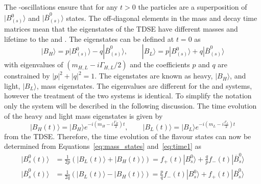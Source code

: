 {The \bsd-\barbsd oscillations ensure that for any $t>0$ the particles are a superposition of $| B^0_{(s)} \rangle$ and $| \overline{B}^0_{(s)} \rangle$ states. The off-diagonal elements in the mass and decay time matrices mean that the eigenstates of the TDSE have different masses and lifetime to the \bsd and \barbsd. The eigenstates can be defined at $t=0$ as
\begin{equation}
| B_H \rangle = p | B^0_{(s)} \rangle - q |\overline{B}^0_{(s)} \rangle, \qquad |B_L \rangle = p  | B^0_{(s)} \rangle + q | \overline{B}^0_{(s)} \rangle
\label{eq:mass_states}
\end{equation}
with eigenvalues of $(m_{H,L} - i\Gamma_{H,L}/2)$ and the coefficients $p$ and $q$ are constrained by $|p|^2 + |q|^2 = 1$. The eigenstates are known as heavy, $| B_H \rangle$, and light, $| B_L \rangle$, mass eigenstates. The eigenvalues are different for the \bd and \bs systems, however the treatment of the two systems is identical. To simplify the notation only the \bs system will be described in the following discussion.
The time evolution of the heavy and light mass eigenstates is given by
\begin{equation}
  | B_H (t)\rangle = | B_H \rangle e^{-i(m_H - i\frac{\Gamma_H}{2})t}, \qquad | B_L (t)\rangle = | B_L \rangle e^{-i(m_L - i\frac{\Gamma_L}{2})t}
\label{eq:time1}
\end{equation}
from the TDSE. Therefore, the time evolution of the flavour states can now be determined from Equations~\ref{eq:mass_states} and~\ref{eq:time1} as
\begin{align}
| B^{0}_{s}(t) \rangle &= \frac{1}{2p}\left(|B_{L}(t)\rangle + |B_{H}(t) \rangle \right)  = f_{+}(t) |B^{0}_{s} \rangle + \frac{q}{p}f_{-}(t) |\overline{B}^{0}_{s}\rangle  \label{eq:AAA}\\
| \overline{B}^{0}_{s}(t) \rangle &= \frac{1}{2q}\left(|B_{L}(t)\rangle - |B_{H}(t) \rangle \right)  = \frac{p}{q}f_{-}(t) |B^{0}_{s} \rangle+ f_{+}(t) |\overline{B}^{0}_{s}\rangle \label{eq:BBB}
\end{align}

}
